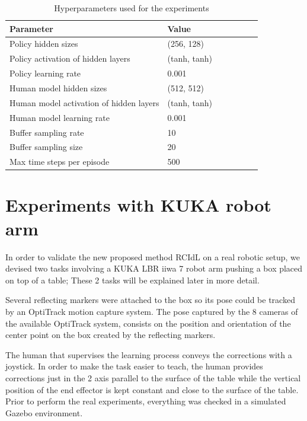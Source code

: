 \begin{table}[H]
\centering
\renewcommand{\arraystretch}{1.4}
\begin{tabular}{llS[table-format=2.2]SSS[table-format=2.2]S[table-format=2.2]}
\toprule
\textbf{Parameter }& \textbf{Value}\\[-.4em]
\midrule
Policy hidden sizes  &   (256, 128)\\
Policy activation of hidden layers  &   (tanh, tanh)\\
Policy learning rate  &  0.001\\
Human model hidden sizes &   (512, 512)\\
Human model activation of hidden layers  &   (tanh, tanh)\\
Human model learning rate  &   0.001\\
Buffer sampling rate&   10\\
Buffer sampling size &   20\\
Max time steps per episode &   500\\
\bottomrule
\end{tabular}
\caption{Hyperparameters used for the experiments}
\label{tab:hyperparameters}
\end{table}



\section{Experiments with KUKA robot arm}
\label{section:Experiments with KUKA robot arm}

In order to validate the new proposed method RCIdL on a real robotic setup, we devised two tasks involving a KUKA LBR iiwa 7 robot arm pushing a box placed on top of a table; These 2 tasks will be explained later in more detail.

Several reflecting markers were attached to the box so its pose could be tracked by an OptiTrack motion capture system. The pose captured by the 8 cameras of the available OptiTrack system, consists on the position and orientation of the center point on the box created by the reflecting markers. 

The human that supervises the learning process conveys the corrections with a joystick. In order to make the task easier to teach, the human provides corrections just in the 2 axis parallel to the surface of the table while the vertical position of the end effector is kept constant and close to the surface of the table. Prior to perform the real experiments, everything was checked in a simulated Gazebo environment.

